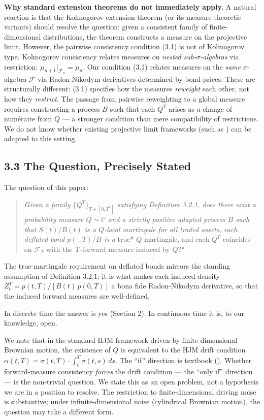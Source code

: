 \documentclass[
]{article}
\begin{document}
\textbf{Why standard extension theorems do not immediately apply.} A
natural reaction is that the Kolmogorov extension theorem (or its
measure-theoretic variants) should resolve the question: given a
consistent family of finite-dimensional distributions, the theorem
constructs a measure on the projective limit. However, the pairwise
consistency condition (3.1) is not of Kolmogorov type. Kolmogorov
consistency relates measures on \emph{nested sub-$\sigma$-algebras} via
restriction: \(\mu_{n+1}|_{\mathcal{F}_n} = \mu_n\). Our condition (3.1)
relates measures on the \emph{same} $\sigma$-algebra \(\mathcal{F}\) via
Radon-Nikodym derivatives determined by bond prices. These are
structurally different: (3.1) specifies how the measures \emph{reweight}
each other, not how they \emph{restrict}. The passage from pairwise
reweighting to a global measure requires constructing a process \(B\)
such that each \(Q^T\) arises as a change of numéraire from \(Q\) --- a
stronger condition than mere compatibility of restrictions. We do not
know whether existing projective limit frameworks (such as \citealt{BalbasIbanezLopez2002}) can be adapted to this setting.

\subsection{3.3 The Question, Precisely
Stated}\label{the-question-precisely-stated}

The question of this paper:

\begin{quote}
\emph{Given a family \(\{Q^T\}_{T \in [0,T^*]}\) satisfying Definition
3.2.1, does there exist a probability measure \(Q \sim \mathbb{P}\) and
a strictly positive adapted process \(B\) such that \(S(t)/B(t)\) is a
\(Q\)-local martingale for all traded assets, each deflated bond
\(p(\cdot,T)/B\) is a }true* \(Q\)-martingale, and each \(Q^T\)
coincides on \(\mathcal{F}_T\) with the T-forward measure induced by
\(Q\)?*
\end{quote}

The true-martingale requirement on deflated bonds mirrors the standing
assumption of Definition 3.2.1: it is what makes each induced density
\(Z^T_t = p(t,T)/[B(t)\,p(0,T)]\) a bona fide Radon-Nikodym derivative,
so that the induced forward measures are well-defined.

In discrete time the answer is yes (Section 2). In continuous time it
is, to our knowledge, open.

We note that in the standard HJM framework driven by finite-dimensional
Brownian motion, the existence of \(Q\) is equivalent to the HJM drift
condition
\(\alpha(t,T) = \sigma(t,T) \cdot \int_t^T \sigma(t,s) \, ds\). The
``if'' direction is textbook (\citealt{HeathJarrowMorton1992}). Whether
forward-measure consistency \emph{forces} the drift condition --- the
``only if'' direction --- is the non-trivial question. We state this as
an open problem, not a hypothesis we are in a position to resolve. The
restriction to finite-dimensional driving noise is substantive; under
infinite-dimensional noise (cylindrical Brownian motion), the question
may take a different form.
\end{document}
